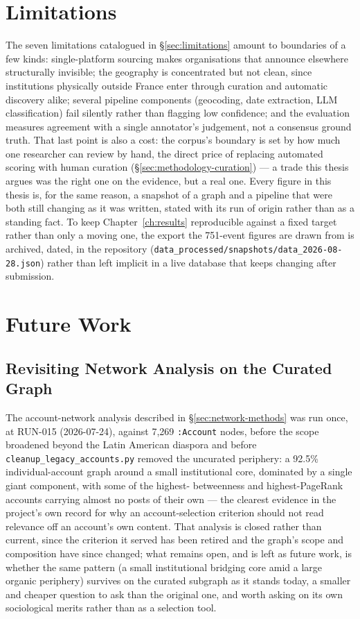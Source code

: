 \documentclass[12pt, a4paper]{report}
\begin{document}
\section{Limitations}

The seven limitations catalogued in \S\ref{sec:limitations} amount to
boundaries of a few kinds: single-platform sourcing makes organisations
that announce elsewhere structurally invisible; the geography is
concentrated but not clean, since institutions physically outside
France enter through curation and automatic discovery alike; several
pipeline components (geocoding, date extraction, LLM classification)
fail silently rather than flagging low confidence; and the evaluation
measures agreement with a single annotator's judgement, not a consensus
ground truth. That last point is also a cost: the corpus's boundary is
set by how much one researcher can review by hand, the direct price of
replacing automated scoring with human curation
(\S\ref{sec:methodology-curation}) — a trade this thesis argues was the
right one on the evidence, but a real one. Every figure in this thesis
is, for the same reason, a snapshot of a graph and a pipeline that were
both still changing as it was written, stated with its run of origin
rather than as a standing fact. To keep Chapter~\ref{ch:results}
reproducible against a fixed target rather than only a moving one, the
export the 751-event figures are drawn from is archived, dated, in the
repository (\texttt{data\_processed/snapshots/data\_2026-08-28.json})
rather than left implicit in a live database that keeps changing after
submission.

\section{Future Work}
\label{sec:future-work}

\subsection{Revisiting Network Analysis on the Curated Graph}
\label{sec:future-work-network}

The account-network analysis described in \S\ref{sec:network-methods}
was run once, at RUN-015 (2026-07-24), against 7{,}269 \texttt{:Account}
nodes, before the scope broadened beyond the Latin American diaspora and
before \texttt{cleanup\_legacy\_accounts.py} removed the uncurated
periphery: a 92.5\% individual-account graph around a small institutional
core, dominated by a single giant component, with some of the highest-
betweenness and highest-PageRank accounts carrying almost no posts of
their own — the clearest evidence in the project's own record for why an
account-selection criterion should not read relevance off an account's
own content. That analysis is closed rather than current, since the
criterion it served has been retired and the graph's scope and
composition have since changed; what remains open, and is left as future
work, is whether the same pattern (a small institutional bridging core
amid a large organic periphery) survives on the curated subgraph as it
stands today, a smaller and cheaper question to ask than the original
one, and worth asking on its own sociological merits rather than as a
selection tool.
\end{document}
